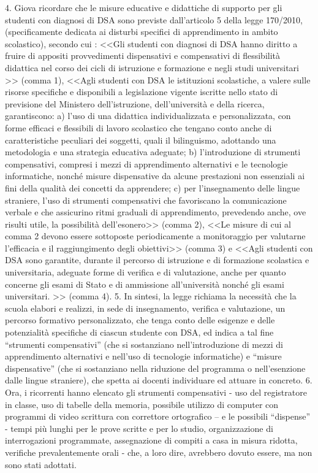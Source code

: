 4. Giova ricordare che le misure educative e didattiche di supporto per gli studenti con diagnosi di DSA sono previste dall’articolo 5 della legge 170/2010, (specificamente dedicata ai disturbi specifici di apprendimento in ambito scolastico), secondo cui : <<Gli studenti con diagnosi di DSA hanno diritto a fruire di appositi provvedimenti dispensativi e compensativi di flessibilità didattica nel corso dei cicli di istruzione e formazione e negli studi universitari >> (comma 1), <<Agli studenti con DSA le istituzioni scolastiche, a valere sulle risorse specifiche e disponibili a legislazione vigente iscritte nello stato di previsione del Ministero dell’istruzione, dell’università e della ricerca, garantiscono: a) l’uso di una didattica individualizzata e personalizzata, con forme efficaci e flessibili di lavoro scolastico che tengano conto anche di caratteristiche peculiari dei soggetti, quali il bilinguismo, adottando una metodologia e una strategia educativa adeguate; b) l’introduzione di strumenti compensativi, compresi i mezzi di apprendimento alternativi e le tecnologie informatiche, nonché misure dispensative da alcune prestazioni non essenziali ai fini della qualità dei concetti da apprendere; c) per l’insegnamento delle lingue straniere, l’uso di strumenti compensativi che favoriscano la comunicazione verbale e che assicurino ritmi graduali di apprendimento, prevedendo anche, ove risulti utile, la possibilità dell’esonero>> (comma 2), <<Le misure di cui al comma 2 devono essere sottoposte periodicamente a monitoraggio per valutarne l’efficacia e il raggiungimento degli obiettivi>> (comma 3) e <<Agli studenti con DSA sono garantite, durante il percorso di istruzione e di formazione scolastica e universitaria, adeguate forme di verifica e di valutazione, anche per quanto concerne gli esami di Stato e di ammissione all’università nonché gli esami universitari. >> (comma 4).
5. In sintesi, la legge richiama la necessità che la scuola elabori e realizzi, in sede di insegnamento, verifica e valutazione, un percorso formativo personalizzato, che tenga conto delle esigenze e delle potenzialità specifiche di ciascun studente con DSA, ed indica a tal fine “strumenti compensativi” (che si sostanziano nell’introduzione di mezzi di apprendimento alternativi e nell’uso di tecnologie informatiche) e “misure dispensative” (che si sostanziano nella riduzione del programma o nell’esenzione dalle lingue straniere), che spetta ai docenti individuare ed attuare in concreto.
6. Ora, i ricorrenti hanno elencato gli strumenti compensativi - uso del registratore in classe, uso di tabelle della memoria, possibile utilizzo di computer con programmi di video scrittura con correttore ortografico – e le possibili “dispense” - tempi più lunghi per le prove scritte e per lo studio, organizzazione di interrogazioni programmate, assegnazione di compiti a casa in misura ridotta, verifiche prevalentemente orali - che, a loro dire, avrebbero dovuto essere, ma non sono stati adottati.
